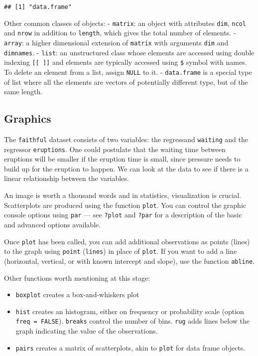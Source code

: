 \documentclass[]{book}
\providecommand{\tightlist}{%
  \setlength{\itemsep}{0pt}\setlength{\parskip}{0pt}}
\theoremstyle{definition}
\theoremstyle{definition}
\theoremstyle{definition}
\theoremstyle{remark}
\begin{document}
\begin{verbatim}
## [1] "data.frame"
\end{verbatim}

Other common classes of objects: - \texttt{matrix}: an object with
attributes \texttt{dim}, \texttt{ncol} and \texttt{nrow} in addition to
\texttt{length}, which gives the total number of elements. -
\texttt{array}: a higher dimensional extension of \texttt{matrix} with
arguments \texttt{dim} and \texttt{dimnames}. - \texttt{list}: an
unstructured class whose elements are accessed using double indexing
\texttt{{[}{[}\ {]}{]}} and elements are typically accessed using
\texttt{\$} symbol with names. To delete an element from a list, assign
\texttt{NULL} to it. - \texttt{data.frame} is a special type of list
where all the elements are vectors of potentially different type, but of
the same length.

\subsection{Graphics}\label{graphics}

The \texttt{faithful} dataset consists of two variables: the regressand
\texttt{waiting} and the regressor \texttt{eruptions}. One could
postulate that the waiting time between eruptions will be smaller if the
eruption time is small, since pressure needs to build up for the
eruption to happen. We can look at the data to see if there is a linear
relationship between the variables.

An image is worth a thousand words and in statistics, visualization is
crucial. Scatterplots are produced using the function \texttt{plot}. You
can control the graphic console options using \texttt{par} --- see
\texttt{?plot} and \texttt{?par} for a description of the basic and
advanced options available.

Once \texttt{plot} has been called, you can add additional observations
as points (lines) to the graph using \texttt{point} (\texttt{lines}) in
place of \texttt{plot}. If you want to add a line (horizontal, vertical,
or with known intercept and slope), use the function \texttt{abline}.

Other functions worth mentioning at this stage:

\begin{itemize}
\tightlist
\item
  \texttt{boxplot} creates a box-and-whiskers plot
\item
  \texttt{hist} creates an histogram, either on frequency or probability
  scale (option \texttt{freq\ =\ FALSE}). \texttt{breaks} control the
  number of bins. \texttt{rug} adds lines below the graph indicating the
  value of the observations.
\item
  \texttt{pairs} creates a matrix of scatterplots, akin to \texttt{plot}
  for data frame objects.
\end{itemize}
\end{document}
